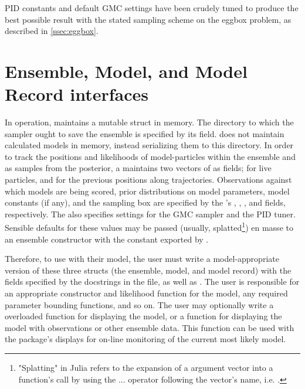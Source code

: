 PID constants and default GMC settings have been crudely tuned to produce the best possible result with the stated sampling scheme on the eggbox problem, as described in \autoref{ssec:eggbox}.

\section{Ensemble, Model, and Model Record interfaces}
In operation,  maintains a  mutable struct in memory. The directory to which the sampler ought to save the ensemble is specified by its  field.  does not maintain calculated models in memory, instead serializing them to this directory. In order to track the positions and likelihoods of model-particles within the ensemble and as samples from the posterior, a  maintains two vectors of  as fields;  for live particles, and  for the previous positions along trajectories. Observations against which models are being scored, prior distributions on model parameters, model constants (if any), and the sampling box are specified by the 's , , , and  fields, respectively. The  also specifies settings for the GMC sampler and the PID tuner. Sensible defaults for these values may be passed (usually, splatted\footnote{"Splatting" in Julia refers to the expansion of a argument vector into a function's call by using the ... operator following the vector's name, i.e. .}) en masse to an ensemble constructor with the  constant exported by .

Therefore, to use  with their model, the user must write a model-appropriate version of these three structs (the ensemble, model, and model record) with the fields specified by the docstrings in the  file, as well as . The user is responsible for an appropriate constructor and likelihood function for the model, any required parameter bounding functions, and so on. The user may optionally write a overloaded  function for displaying the model, or a  function for displaying the model with observations or other ensemble data. This function can be used with the package's  displays for on-line monitoring of the current most likely model.

